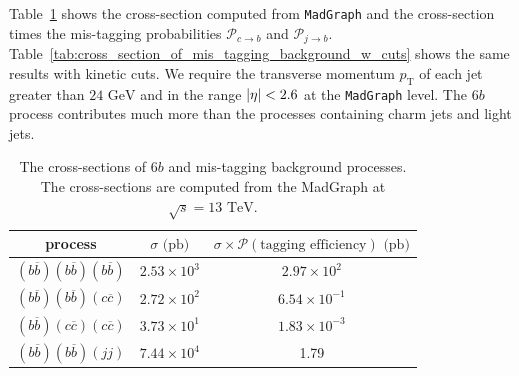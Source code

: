 \documentclass[12pt]{article}
\begin{document}
	Table~\ref{tab:cross_section_of_mis_tagging_background} shows the cross-section computed from \verb|MadGraph| and the cross-section times the mis-tagging probabilities $\mathcal{P}_{c\to b}$ and $\mathcal{P}_{j\to b}$. Table~\ref{tab:cross_section_of_mis_tagging_background_w_cuts} shows the same results with kinetic cuts. We require the transverse momentum $p_{\text{T}}$ of each jet greater than $\text{24 GeV}$ and in the range $\abs{\eta} < 2.6$ at the \verb|MadGraph| level. The $6b$ process contributes much more than the processes containing charm jets and light jets.
	\begin{table}[htpb]
		\centering
		\caption{The cross-sections of $6b$ and mis-tagging background processes. The cross-sections are computed from the MadGraph at $\sqrt{s} = 13 \text{ TeV}$.}
		\label{tab:cross_section_of_mis_tagging_background}
		\begin{tabular}{c|cc}
		process                                         & $\sigma\text{ (pb)}$ & $\sigma\times\mathcal{P}(\text{tagging efficiency})\text{ (pb)}$ \\ \hline
		$(b\overline{b})(b\overline{b})(b\overline{b})$ & $2.53 \times 10^{3}$ & $2.97 \times 10^{2}$                                             \\
		$(b\overline{b})(b\overline{b})(c\overline{c})$ & $2.72 \times 10^{2}$ & $6.54 \times 10^{-1}$                                            \\
		$(b\overline{b})(c\overline{c})(c\overline{c})$ & $3.73 \times 10^{1}$ & $1.83 \times 10^{-3}$                                            \\
		$(b\overline{b})(b\overline{b})(jj)$            & $7.44 \times 10^{4}$ & 1.79
		\end{tabular}
	\end{table}
\end{document}
